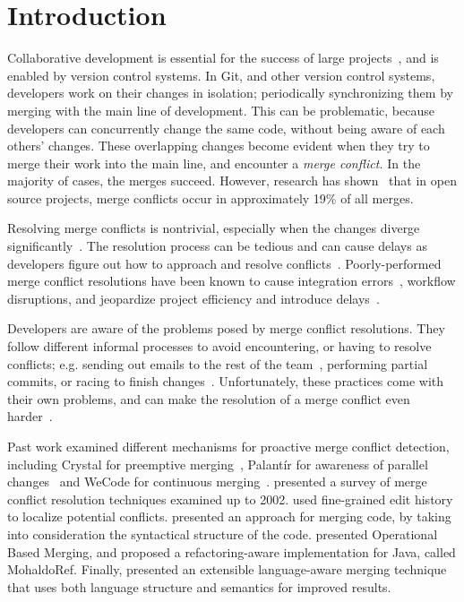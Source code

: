 
\section{Introduction}\label{introduction}

Collaborative development is essential for the success of large projects~\cite{hattori2010syde}, and is enabled by version control systems. 
In Git, and other version control systems, developers work on their changes in isolation; periodically synchronizing them by merging with the main line of development. 
This can be problematic, because developers can concurrently change the same code, without being aware of each others' changes.
These overlapping changes become evident when they try to merge their work into the main line, and encounter a \emph{merge conflict.}
In the majority of cases, the merges succeed.
However, research has shown~\cite{cassandra,Brun2011} that in open source projects, merge conflicts occur in approximately 19\% of all merges.

Resolving merge conflicts is nontrivial, especially when the changes diverge significantly~\cite{Brun2011}.
The resolution process can be tedious and can cause delays as developers figure out how to approach and resolve conflicts~\cite{cassandra}. 
Poorly-performed merge conflict resolutions have been known to cause integration errors~\cite{bird-branches-conflict}, workflow disruptions, and jeopardize project efficiency and introduce delays~\cite{estler2014awareness}. 

Developers are aware of the problems posed by merge conflict resolutions.
They follow different informal processes to avoid encountering, or having to resolve conflicts; e.g. sending out emails to the rest of the team~\cite{deSouza2003breaking}, performing partial commits, or racing to finish changes~\cite{cataldo2008distributed_dev}.
Unfortunately, these practices come with their own problems, and can make the resolution of a merge conflict even harder~\cite{Brun2011}. 

Past work examined different mechanisms for proactive merge conflict detection, including Crystal for preemptive merging~\cite{Brun2011}, Palant\'{i}r for awareness of parallel changes~\cite{palantir} and WeCode for continuous merging~\cite{Guimaraes}.
\citet{mens2002state} presented a survey of merge conflict resolution techniques examined up to 2002.
\citet{nishimura} used fine-grained edit history to localize potential conflicts.
\citet{apel_semistructured_2011,apel_structured_2012-1} presented an approach for merging code, by taking into consideration the syntactical structure of the code.
\citet{lippe_operation-based_1992} presented Operational Based Merging, and \citet{dig_effective_2008} proposed a refactoring-aware implementation for Java, called MohaldoRef.
Finally, \citet{hunt2002extensible} presented an extensible language-aware merging technique that uses both language structure and semantics for improved results.

